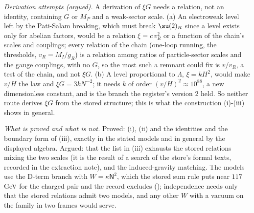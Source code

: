 \emph{Derivation attempts (argued).} A derivation of $\xi G$ needs a relation, not an identity, containing $G$ or $M_{P}$ and a weak-sector scale. (a) An electroweak level left by the Pati-Salam breaking, which must break $\su(2)_{R}$ since a level exists only for abelian factors, would be a relation $\xi = c\,v_{R}^{2}$ or a function of the chain's scales and couplings; every relation of the chain (one-loop running, the thresholds, $v_{R} = M_{I}/g_{R}$) is a relation among ratios of particle-sector scales and the gauge couplings, with no $G$, so the most such a remnant could fix is $v/v_{R}$, a test of the chain, and not $\xi G$. (b) A level proportional to $\Lambda$, $\xi = kH^{2}$, would make $v/H$ the law and $\xi G = 3kN^{-2}$; it needs $k$ of order $(v/H)^{2} \approx 10^{88}$, a new dimensionless constant, and is the branch the register's version 2 held. So neither route derives $\xi G$ from the stored structure; this is what the construction (i)-(iii) shows in general.

\emph{What is proved and what is not.} Proved: (i), (ii) and the identities and the boundary form of (iii), exactly in the stated models and in general by the displayed algebra. Argued: that the list in (iii) exhausts the stored relations mixing the two scales (it is the result of a search of the store's formal texts, recorded in the extraction note), and the induced-gravity matching. The models use the D-term branch with $W = \kappa\mathsf{N}^{2}$, which the stored sum rule puts near $117$ GeV for the charged pair and the record excludes (); independence needs only that the stored relations admit two models, and any other $W$ with a vacuum on the family in two frames would serve.
